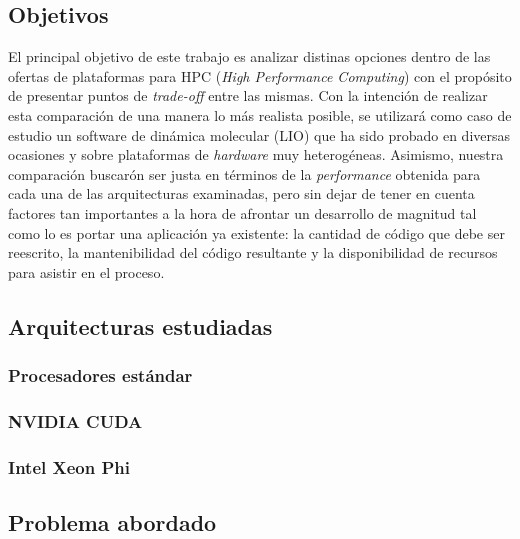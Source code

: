 \subsection{Objetivos}

El principal objetivo de este trabajo es analizar distinas opciones dentro de
las ofertas de plataformas para HPC (\textit{High Performance Computing}) con
el prop\'osito de presentar puntos de \textit{trade-off} entre las mismas. Con la
intenci\'on de realizar esta comparaci\'on de una manera lo m\'as realista posible,
se utilizar\'a como caso de estudio un software de din\'amica molecular (LIO) que
ha sido probado en diversas ocasiones y sobre plataformas de \textit{hardware}
muy heterogéneas. Asimismo, nuestra comparaci\'on buscar\'on ser justa en t\'erminos
de la \textit{performance} obtenida para cada una de las arquitecturas
examinadas, pero sin dejar de tener en cuenta factores tan importantes a la
hora de afrontar un desarrollo de magnitud tal como lo es portar una
aplicación ya existente: la cantidad de c\'odigo que debe ser reescrito, la
mantenibilidad del c\'odigo resultante y la disponibilidad de recursos para
asistir en el proceso.

\subsection{Arquitecturas estudiadas}

\subsubsection{Procesadores est\'andar}



\subsubsection{NVIDIA CUDA}



\subsubsection{Intel Xeon Phi}



\subsection{Problema abordado}


